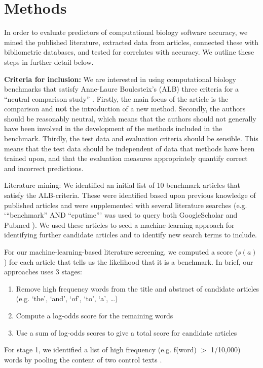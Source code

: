 \documentclass[fleqn,10pt]{SelfArx} %
\begin{document}
\section*{Methods}
In order to evaluate predictors of computational biology software accuracy, we mined the published literature, extracted data from articles, connected these with bibliometric databases, and tested for correlates with accuracy. We outline these steps in further detail below. 

\textbf{Criteria for inclusion:} We are interested in using computational biology benchmarks that satisfy Anne-Laure Boulesteix’s (ALB) three criteria for a “neutral comparison study” \cite{Boulesteix2013-vb}. Firstly, the main focus of the article is the comparison and \textbf{not} the introduction of a new method. Secondly, the authors should be reasonably neutral, which means that the authors should not generally have been involved in the development of the methods included in the benchmark. Thirdly, the test data and evaluation criteria should be sensible. This means that the test data should be independent of data that methods have been trained upon, and that the evaluation measures appropriately quantify correct and incorrect predictions.

Literature mining: We identified an initial list of 10 benchmark articles that satisfy the ALB-criteria. These were identified based upon previous knowledge of published articles and were supplemented with several literature searches (e.g. ‘“benchmark” AND “cputime”’ was used to query both GoogleScholar and Pubmed \cite{Sayers2010-vm,McEntyre2001-fl}). We used these articles to seed a machine-learning approach for identifying further candidate articles and to identify new search terms to include.

For our machine-learning-based literature screening, we computed a score ($s(a)$) for each article that tells us the likelihood that it is a benchmark. In brief, our approaches uses 3 stages:
\begin{enumerate}
\item Remove high frequency words from the title and abstract of candidate articles (e.g. ‘the’, ‘and’, ‘of’, ‘to’, ‘a’, …) 
\item Compute a log-odds score for the remaining words 
\item Use a sum of log-odds scores to give a total score for candidate articles
\end{enumerate}
For stage 1, we identified a list of high frequency (e.g. f(word) $>$ 1/10,000) words by pooling the content of two control texts \cite{Carroll1865-hk,Tolkien1937-ke}. 
\end{document}

